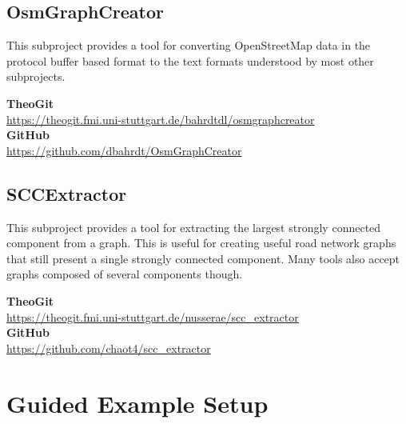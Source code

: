 \documentclass[titlepage,parskip=true]{scrartcl}
\newcommand{\repobox}[2]{
	\begin{shaded}
		\textbf{TheoGit}\\\hspace{5mm}\url{#1}\\
		\textbf{GitHub}\\\hspace{5mm}\url{#2}
	\end{shaded}
}
\begin{document}
\subsection{OsmGraphCreator}
This subproject provides a tool for converting OpenStreetMap data in the
protocol buffer based format to the text formats understood by most other
subprojects.
\repobox{https://theogit.fmi.uni-stuttgart.de/bahrdtdl/osmgraphcreator}{https://github.com/dbahrdt/OsmGraphCreator}
\subsection{SCCExtractor}
This subproject provides a tool for extracting the largest strongly connected
component from a graph. This is useful for creating useful road network graphs
that still present a single strongly connected component. Many tools also
accept graphs composed of several components though.
\repobox{https://theogit.fmi.uni-stuttgart.de/nusserae/scc\_extractor}{https://github.com/chaot4/scc\_extractor}
\section{Guided Example Setup}
\label{sec:setup}
\end{document}
